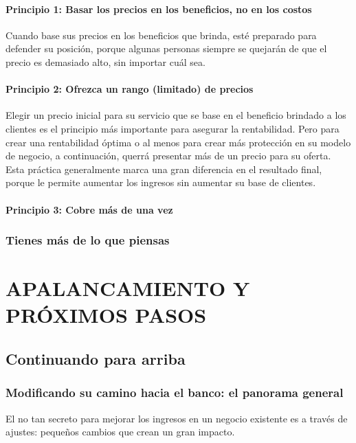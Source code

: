 \documentclass[10pt]{book}
\begin{document}
		\subsection{Principio 1: Basar los precios en los beneficios, no en los costos}
		    Cuando base sus precios en los beneficios que brinda, esté preparado para defender su posición, porque algunas personas siempre se quejarán de que el precio es demasiado alto, sin importar cuál sea. 

		\subsection{Principio 2: Ofrezca un rango (limitado) de precios}
		    Elegir un precio inicial para su servicio que se base en el beneficio brindado a los clientes es el principio más importante para asegurar la rentabilidad. Pero para crear una rentabilidad óptima o al menos para crear más protección en su modelo de negocio, a continuación, querrá presentar más de un precio para su oferta. Esta práctica generalmente marca una gran diferencia en el resultado final, porque le permite aumentar los ingresos sin aumentar su base de clientes.
		
		\subsection{Principio 3: Cobre más de una vez}

	    \section{Tienes más de lo que piensas}

\part{APALANCAMIENTO Y PRÓXIMOS PASOS}

    \chapter{Continuando para arriba}

	\section{Modificando su camino hacia el banco: el panorama general}
	    El no tan secreto para mejorar los ingresos en un negocio existente es a través de ajustes: pequeños cambios que crean un gran impacto.
\end{document}
